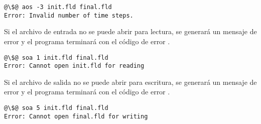 \begin{lstlisting}[style=terminal,escapechar=@]
@\$@ aos -3 init.fld final.fld
Error: Invalid number of time steps.
\end{lstlisting}

Si el archivo de entrada no se puede abrir para lectura,
se generará un mensaje de error y el programa terminará con el código de error 
.

\begin{lstlisting}[style=terminal,escapechar=@]
@\$@ soa 1 init.fld final.fld
Error: Cannot open init.fld for reading
\end{lstlisting}

Si el archivo de salida no se puede abrir para escritura, 
se generará un mensaje de error y el programa terminará con el código de error 
.

\begin{lstlisting}[style=terminal,escapechar=@]
@\$@ soa 5 init.fld final.fld
Error: Cannot open final.fld for writing
\end{lstlisting}

